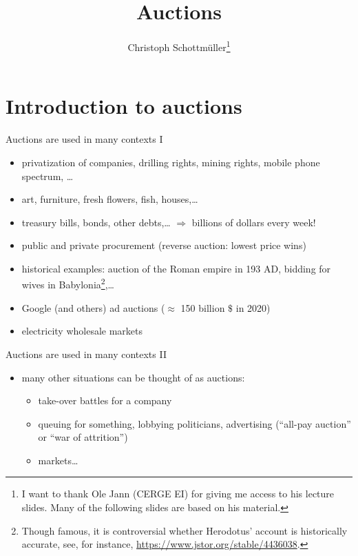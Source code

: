 \documentclass[bigger]{beamer}
\author{Christoph Schottmüller\thanks{I want to thank Ole Jann (CERGE EI) for giving me access to his lecture slides. Many of the following slides are based on his material.}}
\date{}
\title{Auctions}
\begin{document}
\maketitle

\section{Introduction to auctions}
\label{sec:org22b17f4}

\begin{frame}[label={sec:org4e4a376}]{Auctions are used in many contexts I}
\begin{itemize}
\item privatization of companies, drilling rights, mining rights, mobile phone spectrum, \ldots{}
\item art, furniture, fresh ﬂowers, ﬁsh, houses,\ldots{}
\item treasury bills, bonds, other debts,\ldots{} \linebreak \(\Rightarrow\) billions of dollars every week!
\item public and private procurement (reverse auction: lowest price wins)
\item historical examples: auction of the Roman empire in 193 AD, bidding for wives in Babylonia\footnote{\tiny Though famous, it is controversial whether Herodotus' account is historically accurate, see, for instance, \url{https://www.jstor.org/stable/4436038}.},\ldots{}
\item Google (and others) ad auctions (\(\approx\) 150 billion \(\$\) in 2020)
\item electricity wholesale markets
\end{itemize}
\end{frame}
\begin{frame}[label={sec:org14490de}]{Auctions are used in many contexts II}
\begin{itemize}
\item many other situations can be thought of as auctions:
\begin{itemize}
\item take-over battles for a company
\item queuing for something, lobbying politicians, advertising (“all-pay auction” or “war of attrition”)
\item markets\ldots{}
\end{itemize}
\end{itemize}
\end{frame}
\end{document}
